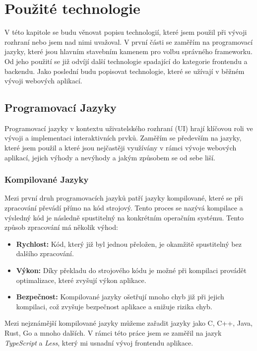 \chapter{Použité technologie}
\label{ch:technology}
V této kapitole se budu věnovat popisu technologií, které jsem použil při vývoji rozhraní nebo jsem nad nimi uvažoval. V první části se zaměřím na programovací jazyky, které jsou hlavním stavebním kamenem pro volbu správného frameworku. Od jeho použití se již odvíjí další technologie spadající do kategorie frontendu a backendu. Jako poslední budu popisovat technologie, které se užívají v běžném vývoji webových aplikací.

\section{Programovací Jazyky}
\label{sec:languages}
Programovací jazyky v kontextu uživatelského rozhraní (UI) hrají klíčovou roli ve vývoji a implementaci interaktivních prvků. Zaměřím se především na jazyky, které jsem použil a které jsou nejčastěji využívány v rámci vývoje webových aplikací, jejich výhody a nevýhody a jakým způsobem se od sebe liší.

\subsection{Kompilované Jazyky}
\label{subsec:languages-compiled}
Mezi první druh programovacích jazyků patří jazyky kompilované, které se při zpracování převádí přímo na kód strojový. Tento proces se nazývá kompilace a výsledný kód je následně spustitelný na konkrétním operačním systému. Tento způsob zpracování má několik výhod:

\begin{itemize}
    \item \textbf{Rychlost:} Kód, který již byl jednou přeložen, je okamžitě spustitelný bez dalšího zpracování.
    \item \textbf{Výkon:} Díky překladu do strojového kódu je možné při kompilaci provádět optimalizace, které zvyšují výkon aplikace.
    \item \textbf{Bezpečnost:} Kompilované jazyky ošetřují mnoho chyb již při jejich kompilaci, což zvyšuje bezpečnost aplikace a snižuje rizika chyb.
\end{itemize}

Mezi nejznámější kompilované jazyky můžeme zařadit jazyky jako C, C++, Java, Rust, Go a mnoho dalších. V rámci této práce jsem se zaměřil na jazyk \textit{TypeScript} a \textit{Less}, který mi usnadní vývoj frontendu aplikace.

